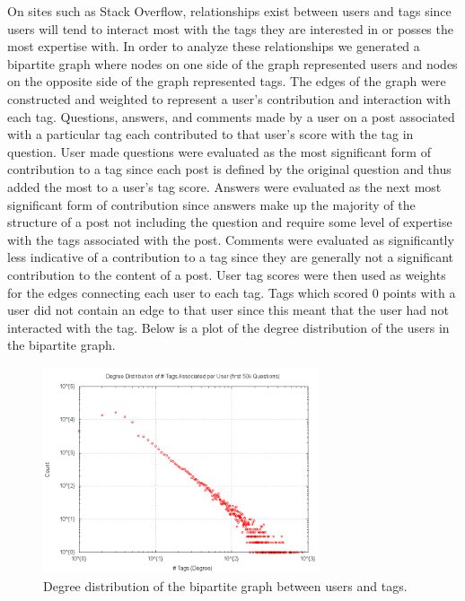 \documentclass[11pt]{IEEEtran}
\begin{document}
On sites such as Stack Overflow, relationships exist between users and tags since users will tend to interact most with the tags they are interested in or posses the most expertise with. In order to analyze these relationships we generated a bipartite graph where nodes on one side of the graph represented users and nodes on the opposite side of the graph represented tags. The edges of the graph were constructed and weighted to represent a user’s contribution and interaction with each tag. Questions, answers, and comments made by a user on a post associated with a particular tag each contributed to that user’s score with the tag in question. User made questions were evaluated as the most significant form of contribution to a tag since each post is defined by the original question and thus added the most to a user’s tag score. Answers were evaluated as the next most significant form of contribution since answers make up the majority of the structure of a post not including the question and require some level of expertise with the tags associated with the post. Comments were evaluated as significantly less indicative of a contribution to a tag since they are generally not a significant contribution to the content of a post. User tag scores were then used as weights for the edges connecting each user to each tag. Tags which scored 0 points with a user did not contain an edge to that user since this meant that the user had not interacted with the tag. Below is a plot of the degree distribution of the users in the bipartite graph.

\begin{figure}[h]
  \centering
    \includegraphics[width=3.2in]{bipartite_degdistr.png}
  \caption{Degree distribution of the bipartite graph between users and tags.}
  \label{fig:bi_dd}
\end{figure}
\end{document}
